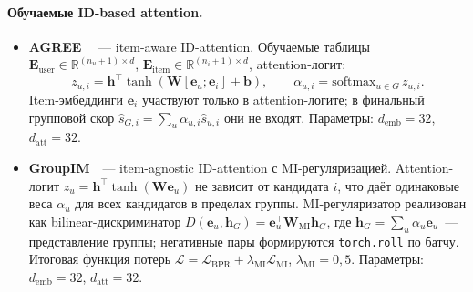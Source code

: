 \paragraph{Обучаемые ID-based attention.}
\begin{itemize}
    \item \textbf{AGREE}~\cite{cao2018agree} ~--- item-aware ID-attention. Обучаемые таблицы $\mathbf{E}_{\mathrm{user}} \in \mathbb{R}^{(n_u + 1) \times d}$, $\mathbf{E}_{\mathrm{item}} \in \mathbb{R}^{(n_i + 1) \times d}$, attention-логит:
    \begin{equation*}
        z_{u, i} = \mathbf{h}^\top \tanh\!\left( \mathbf{W} [\mathbf{e}_u; \mathbf{e}_i] + \mathbf{b} \right),
        \qquad \alpha_{u, i} = \mathrm{softmax}_{u \in G}\, z_{u, i}.
    \end{equation*}
    Item-эмбеддинги $\mathbf{e}_i$ участвуют только в attention-логите; в финальный групповой скор $\hat{s}_{G, i} = \sum_u \alpha_{u, i} \hat{s}_{u, i}$ они не входят. Параметры: $d_{\mathrm{emb}} = 32$, $d_{\mathrm{att}} = 32$.
    \item \textbf{GroupIM}~\cite{sankar2020groupim}~--- item-agnostic ID-attention с MI-регуляризацией. Attention-логит $z_u = \mathbf{h}^\top \tanh(\mathbf{W}\mathbf{e}_u)$ не зависит от кандидата $i$, что даёт одинаковые веса $\alpha_u$ для всех кандидатов в пределах группы. MI-регуляризатор реализован как bilinear-дискриминатор $D(\mathbf{e}_u, \mathbf{h}_G) = \mathbf{e}_u^\top \mathbf{W}_{\mathrm{MI}} \mathbf{h}_G$, где $\mathbf{h}_G = \sum_u \alpha_u \mathbf{e}_u$~--- представление группы; негативные пары формируются \texttt{torch.roll} по батчу. Итоговая функция потерь $\mathcal{L} = \mathcal{L}_{\mathrm{BPR}} + \lambda_{\mathrm{MI}} \mathcal{L}_{\mathrm{MI}}$, $\lambda_{\mathrm{MI}} = 0{,}5$. Параметры: $d_{\mathrm{emb}} = 32$, $d_{\mathrm{att}} = 32$.
\end{itemize}

